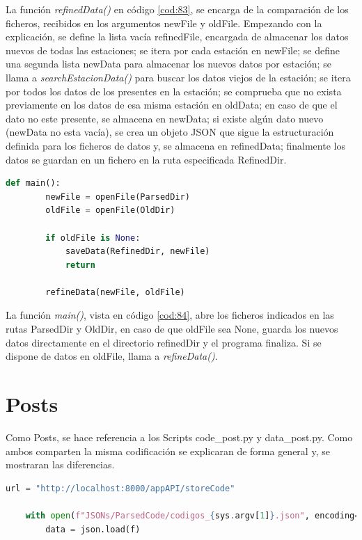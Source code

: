 La función \textit{refinedData()} en código \ref{cod:83}, se encarga de la comparación de los ficheros, recibidos en los argumentos newFile y oldFile. Empezando con la explicación, se define la lista vacía refinedFile, encargada de almacenar los datos nuevos de todas las estaciones; se itera por cada estación en newFile; se define una segunda lista newData para almacenar los nuevos datos por estación; se llama a \textit{searchEstacionData()} para buscar los datos viejos de la estación; se itera por todos los datos de los presentes en la estación; se comprueba que no exista previamente en los datos de esa misma estación en oldData; en caso de que el dato no este presente, se almacena en newData; si existe algún dato nuevo (newData no esta vacía), se crea un objeto JSON que sigue la estructuración definida para los ficheros de datos y, se almacena en refinedData; finalmente los datos se guardan en un fichero en la ruta especificada RefinedDir.

\begin{lstlisting}[language=Python, caption={Declaración rutas JSONs}, label=cod:84]
	def main():
		newFile = openFile(ParsedDir)
		oldFile = openFile(OldDir)
		
		if oldFile is None:
			saveData(RefinedDir, newFile)
			return
		
		refineData(newFile, oldFile)
\end{lstlisting}

La función \textit{main()}, vista en código \ref{cod:84}, abre los ficheros indicados en las rutas ParsedDir y OldDir, en caso de que oldFile sea None, guarda los nuevos datos directamente en el directorio refinedDir y el programa finaliza. Si se dispone de datos en oldFile, llama a \textit{refineData()}.

\section{Posts}
Como Posts, se hace referencia a los Scripts code\_post.py y data\_post.py. Como ambos comparten la misma codificación se explicaran de forma general y, se mostraran las diferencias.

\begin{lstlisting}[language=Python, caption={Declaración variables code\_post.py}, label=cod:85]
	url = "http://localhost:8000/appAPI/storeCode"
	
	with open(f"JSONs/ParsedCode/codigos_{sys.argv[1]}.json", encoding="utf-8") as f:
		data = json.load(f)
\end{lstlisting}

